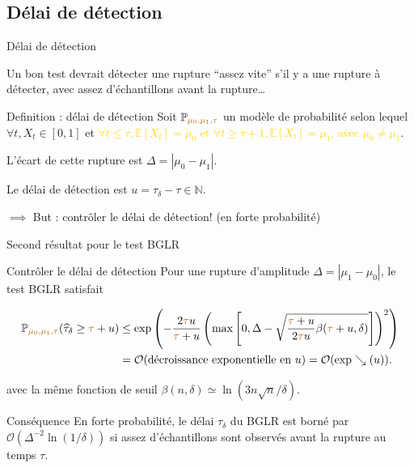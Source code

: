 \documentclass[11pt,french,ignorenonframetext,]{beamer}
\begin{document}
\subsection{\hfill{}Délai de détection\hfill{}}

\begin{frame}{Délai de détection}

  Un bon test devrait détecter une rupture ``assez vite'' s'il y a une rupture à détecter, avec assez d'échantillons avant la rupture\ldots

  \pause
  \begin{block}{Definition : délai de détection}
    Soit $\mathbb{P}_{\textcolor{gold}{\mu_0,\mu_1,\tau}}$ un modèle de probabilité selon lequel $\forall t, X_t \in[0,1]$ et \textcolor{gold}{$\forall t \leq \tau, \mathbb{E}[X_t] = \mu_0$ et $\forall t \geq \tau + 1, \mathbb{E}[X_t] = \mu_1$,
    avec $\mu_0 \neq \mu_1$}.

    L'\alert{écart} de cette rupture est $\Delta = |\mu_0 - \mu_1|$.

    Le \alert{délai de détection} est $u = \widehat{\tau}_{\delta} - \tau \in\mathbb{N}$.
  \end{block}

  \alert{$\implies$ But : contrôler le délai de détection!} (en forte probabilité)

\end{frame}

\begin{frame}{Second résultat pour le test BGLR \dSmiley{}}

  \begin{block}{Contrôler le délai de détection}
      Pour une rupture d'amplitude $\Delta = |\mu_1 - \mu_0|$,
      le test BGLR satisfait
      \begin{small}
        \begin{align*}
            \mathbb{P}_{\textcolor{gold}{\mu_0,\mu_1,\tau}} (\widehat{\tau}_{\delta} \geq \textcolor{gold}{\tau} + u) &\leq \exp\left( -\frac{2\textcolor{gold}{\tau} u}{\textcolor{gold}{\tau} + u}\left(\max\left[ 0, \Delta - \sqrt{\frac{\textcolor{gold}{\tau} + u}{2\textcolor{gold}{\tau} u} \beta(\textcolor{gold}{\tau} + u,\delta)} \right]\right)^2 \right) \\
            &= \mathcal{O}(\text{décroissance exponentielle en~} u)
            = \mathcal{O}(\exp\searrow(u)).
        \end{align*}
      \end{small}
      avec la même fonction de seuil
      $\beta(n,\delta) \simeq \ln(3n \sqrt{n}/\delta)$.
  \end{block}

  \begin{exampleblock}{Conséquence}
    En forte probabilité, \alert{le délai $\widehat{\tau}_\delta$ du BGLR est borné} par $\mathcal{O}(\Delta^{-2} \ln(1/\delta))$ \alert{si assez d'échantillons sont observés avant la rupture} au temps $\tau$.
  \end{exampleblock}

\end{frame}
\end{document}

